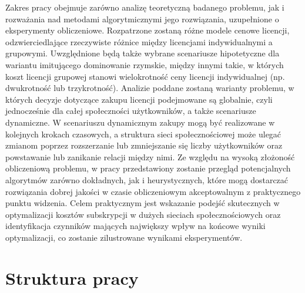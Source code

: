 Zakres pracy obejmuje zarówno analizę teoretyczną badanego problemu, jak i rozważania nad metodami algorytmicznymi jego rozwiązania, uzupełnione o eksperymenty obliczeniowe. Rozpatrzone zostaną różne modele cenowe licencji, odzwierciedlające rzeczywiste różnice między licencjami indywidualnymi a grupowymi. 
Uwzględnione będą także wybrane scenariusze hipotetyczne dla wariantu imitującego dominowanie rzymskie, między innymi takie, w których koszt licencji grupowej stanowi wielokrotność ceny licencji indywidualnej (np. dwukrotność lub trzykrotność). 
Analizie poddane zostaną warianty problemu, w których decyzje dotyczące zakupu licencji podejmowane są globalnie, czyli jednocześnie dla całej społeczności użytkowników, a także scenariusze dynamiczne. W scenariuszu dynamicznym zakupy mogą być realizowane w kolejnych krokach czasowych, a struktura sieci społecznościowej może ulegać zmianom poprzez rozszerzanie lub zmniejszanie się liczby użytkowników oraz powstawanie lub zanikanie relacji między nimi. Ze względu na wysoką złożoność obliczeniową problemu, w pracy przedstawiony zostanie przegląd potencjalnych algorytmów zarówno dokładnych, jak i heurystycznych, które mogą dostarczać rozwiązania dobrej jakości w czasie obliczeniowym akceptowalnym z praktycznego punktu widzenia. Celem praktycznym jest wskazanie podejść skutecznych w optymalizacji kosztów subskrypcji w dużych sieciach społecznościowych oraz identyfikacja czynników mających największy wpływ na końcowe wyniki optymalizacji, co zostanie zilustrowane wynikami eksperymentów.

\section{Struktura pracy}

